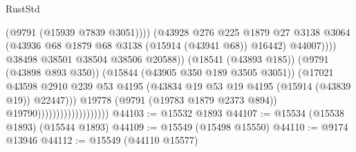 \begin{lexlean}{RustStd}
\begin{coremodule}
                                                          (@9791 (@15939 @7839 @3051))))
                                                      (@43928
                                                        @276
                                                        @225
                                                        @1879
                                                        @27
                                                        @3138
                                                        @3064
                                                        (@43936
                                                          @68
                                                          @1879
                                                          @68
                                                          @3138
                                                          (@15914 (@43941 @68))
                                                          @16442)
                                                        @44007))))
                                                @38498
                                                @38501
                                                @38504
                                                @38506
                                                @20588))
                                            (@18541 (@43893 @185))
                                            (@9791 (@43898 @893 @350))
                                            (@15844 (@43905 @350 @189 @3505 @3051))
                                            (@17021
                                              @43598
                                              @2910
                                              @239
                                              @53
                                              @4195
                                              (@43834
                                                @19
                                                @53
                                                @19
                                                @4195
                                                (@15914 (@43839 @19))
                                                @22447)))
                                          @19778
                                          (@9791 (@19783 @1879 @2373 @894))
                                          @19790)))))))))))))))))))
@44103 := @15532 @1893
@44107 := @15534 (@15538 @1893) (@15544 @1893)
@44109 := @15549 (@15498 @15550)
@44110 := @9174 @13946
@44112 := @15549 (@44110 @15577)

\end{coremodule}
\end{lexlean}
